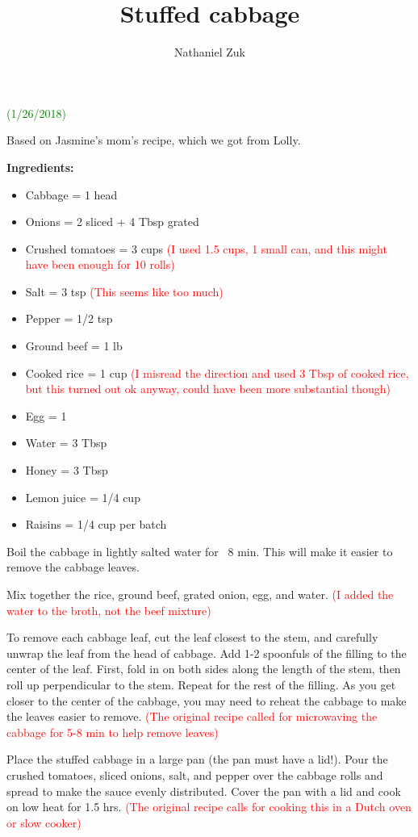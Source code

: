 \documentclass[11pt]{article}
\title{Stuffed cabbage}
\author{Nathaniel Zuk}
\begin{document}
\maketitle

\textcolor{green}{(1/26/2018)}

Based on Jasmine's mom's recipe, which we got from Lolly.

\textbf{Ingredients:}

\begin{itemize}
\item Cabbage = 1 head
\item Onions = 2 sliced + 4 Tbsp grated
\item Crushed tomatoes = 3 cups \textcolor{red}{(I used 1.5 cups, 1 small can, and this might have been enough for 10 rolls)}
\item Salt = 3 tsp \textcolor{red}{(This seems like too much)}
\item Pepper = 1/2 tsp
\item Ground beef = 1 lb
\item Cooked rice = 1 cup \textcolor{red}{(I misread the direction and used 3 Tbsp of cooked rice, but this turned out ok anyway, could have been more substantial though)}
\item Egg = 1
\item Water = 3 Tbsp
\item Honey = 3 Tbsp
\item Lemon juice = 1/4 cup
\item Raisins = 1/4 cup per batch
\end{itemize}

Boil the cabbage in lightly salted water for ~8 min.  This will make it easier to remove the cabbage leaves.

Mix together the rice, ground beef, grated onion, egg, and water. \textcolor{red}{(I added the water to the broth, not the beef mixture)}

To remove each cabbage leaf, cut the leaf closest to the stem, and carefully unwrap the leaf from the head of cabbage.  Add 1-2 spoonfuls of the filling to the center of the leaf. First, fold in on both sides along the length of the stem, then roll up perpendicular to the stem.  Repeat for the rest of the filling.  As you get closer to the center of the cabbage, you may need to reheat the cabbage to make the leaves easier to remove.  \textcolor{red}{(The original recipe called for microwaving the cabbage for 5-8 min to help remove leaves)}

Place the stuffed cabbage in a large pan (the pan must have a lid!).  Pour the crushed tomatoes, sliced onions, salt, and pepper over the cabbage rolls and spread to make the sauce evenly distributed.   Cover the pan with a lid and cook on low heat for 1.5 hrs. \textcolor{red}{(The original recipe calls for cooking this in a Dutch oven or slow cooker)}
\end{document}
